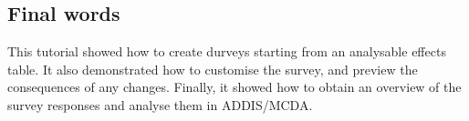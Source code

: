 \documentclass[00_mcda_tutorial.tex]{subfiles}
\begin{document}
\begin{sidebar*}
\subsection*{Final words}
This tutorial showed how to create durveys starting from an analysable effects table. It also demonstrated how to customise the survey, and preview the consequences of any changes. Finally, it showed how to obtain an overview of the survey responses and analyse them in ADDIS/MCDA.

\end{sidebar*}
\end{document}
